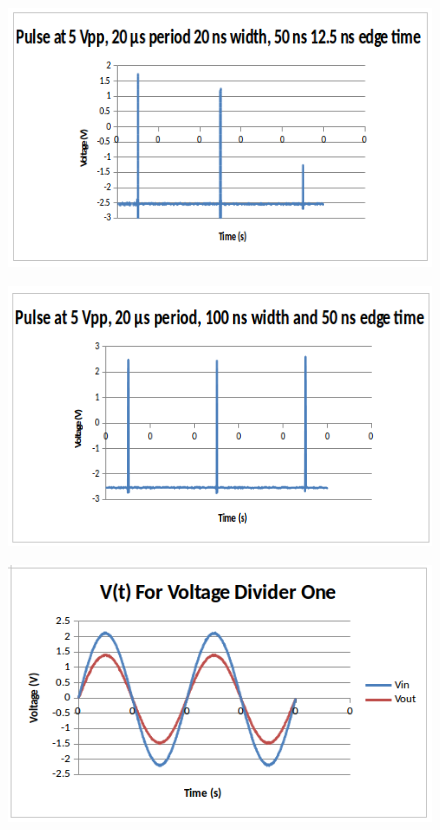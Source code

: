 \documentclass[10pt]{article}
\begin{document}
\begin{figure}[H]
	\centering
	\includegraphics[width=\textwidth]{Pulse125}
\end{figure}
\begin{figure}[H]
	\centering
	\includegraphics[width=\textwidth]{Pulse50}
\end{figure}
\begin{figure}[H]
	\centering
	\includegraphics[width=\textwidth]{Divider1}
\end{figure}
\end{document}
